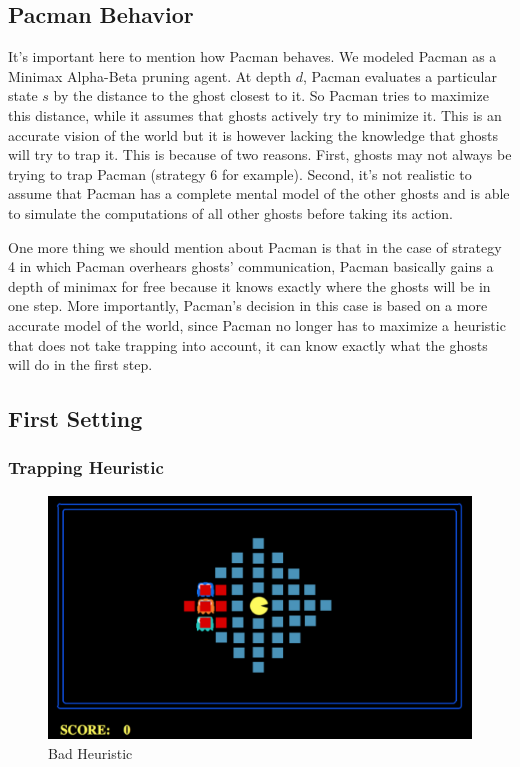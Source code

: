 \documentclass[11pt]{article}
\begin{document}
\begin{multicols}{2}
\subsection{Pacman Behavior}
It's important here to mention how Pacman behaves. We modeled Pacman as a Minimax Alpha-Beta pruning agent. At depth $d$, Pacman evaluates a particular state $s$ by the distance to the ghost closest to it. So Pacman tries to maximize this distance, while it assumes that ghosts actively try to minimize it. This is an accurate vision of the world but it is however lacking the knowledge that ghosts will try to trap it. This is because of two reasons. First, ghosts may not always be trying to trap Pacman (strategy 6 for example). Second, it's not realistic to assume that Pacman has a complete mental model of the other ghosts and is able to simulate the computations of all other ghosts before taking its action.

One more thing we should mention about Pacman is that in the case of strategy 4 in which Pacman overhears ghosts' communication, Pacman basically gains a depth of minimax for free because it knows exactly where the ghosts will be in one step. More importantly, Pacman's decision in this case is based on a more accurate model of the world, since Pacman no longer has to maximize a heuristic that does not take trapping into account, it can know exactly what the ghosts will do in the first step.

\subsection{First Setting}
\subsubsection{Trapping Heuristic}

\begin{figure}[H]
	\includegraphics[width=\columnwidth]{badheuristic.png}
	\caption{Bad Heuristic}
	\label{fig:badheuristic}
\end{figure}


\end{multicols}
\end{document}
